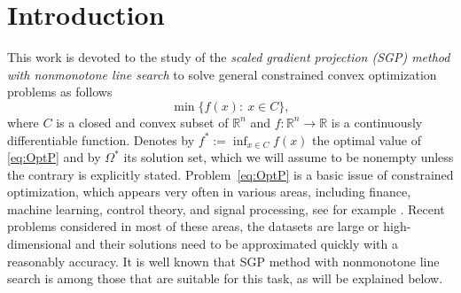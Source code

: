 
\chapter*{Introduction}
\thispagestyle{empty}



This  work is  devoted  to the study of  the {\it scaled gradient projection (SGP) method with nonmonotone line search} to solve general  constrained convex optimization problems as follows
\begin{equation} \label{eq:OptP}
	\min \{ f(x) :~   x\in C\},
\end{equation}
where $C$ is a closed and convex subset of $\mathbb{R}^n$ and $f:\mathbb{R}^n \to \mathbb{R}$ is a continuously differentiable function. Denotes by $f^*:= \inf_{x\in C} f(x)$ the optimal value  of \eqref{eq:OptP} and by  $\Omega^*$  its  solution set, which we will assume to be nonempty unless the contrary is explicitly stated.  Problem~\eqref{eq:OptP} is a basic issue of constrained  optimization, which appears very often in various areas, including  finance,    machine learning, control theory, and signal processing, see for example \cite{Bottou_Curtis_Nocedal2018, Boyd_Ghaoui_Ferron1994, Figueiredo2007, Higham2002, Ma_Hu_Gao2015, Sra_Nowozin_Wright2012}.  Recent problems considered in most of these areas, the datasets are large or high-dimensional  and their solutions need to be approximated quickly with a reasonably accuracy. It is well known that SGP method with nonmonotone line search is among those that are suitable for this task, as will be explained below.

